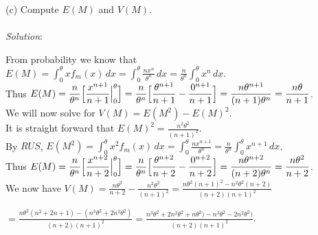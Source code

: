 \documentclass[12pt]{article}
\newcommand{\XB}{\color{black}}
\newcommand{\XV}{\color{violet}}
\begin{document}

(c) Compute $ E(M) $ and $ V(M) $. \\
\vspace{2.5mm} \\
\textit{Solution}:
\vspace{2.5mm}

\noindent 
From probability we know that $ \displaystyle E(M) = \int_{0}^{\theta} xf_{m}(x) \, dx = \int_{0}^{\theta} \frac{nx^{n}}{\theta^{n}} \, dx = \frac{n}{\theta^{n}} \int_{0}^{\theta} x^{n} \, dx $. \\

\noindent 
Thus $ \displaystyle E(M) = \frac{n}{\theta^{n}} \Bigl[ \frac{x^{n + 1}}{n + 1} \Big|_{0}^{\theta} \Bigr] = \frac{n}{\theta^{n}} \Bigl[ \frac{\theta^{n + 1}}{n + 1} - \frac{0^{n + 1}}{n + 1} \Bigr] = \frac{n\theta^{n + 1}}{(n + 1)\theta^{n}} = \frac{n\theta}{n + 1} $. \\

\noindent 
We will now solve for $ V(M) = E(M^{2}) - E(M)^{2} $. \\

\noindent 
It is straight forward that $ \displaystyle E(M)^{2} = \frac{n^{2}\theta^{2}}{(n + 1)^{2}} $. \\

\noindent 
By $ RUS $, $ \displaystyle E(M^{2}) = \int_{0}^{\theta} x^{2}f_{m}(x) \, dx = \int_{0}^{\theta} \frac{nx^{n+1}}{\theta^{n}} = \frac{n}{\theta^{n}} \int_{0}^{\theta} x^{n + 1} \, dx $. \\

\noindent
Thus $ \displaystyle E(M) = \frac{n}{\theta^{n}} \Bigl[ \frac{x^{n + 2}}{n + 2} \Big|_{0}^{\theta} \Bigr] = \frac{n}{\theta^{n}} \Bigl[ \frac{\theta^{n + 2}}{n + 2} - \frac{0^{n + 2}}{n + 2} \Bigr] = \frac{n\theta^{n + 2}}{(n + 2)\theta^{n}} = \frac{n\theta^{2}}{n + 2} $. \\

\noindent 
We now have $ \displaystyle V(M) = \frac{n\theta^{2}}{n + 2} - \frac{n^{2}\theta^{2}}{(n + 1)^{2}} = \frac{n\theta^{2}(n + 1)^{2} - n^{2}\theta^{2}(n + 2)}{(n + 2)(n + 1)^{2}} $ 

$ \displaystyle = \frac{n\theta^{2}(n^{2} + 2n + 1) - (n^{3}\theta^{2} + 2n^{2}\theta^{2})}{(n + 2)(n + 1)^{2}} = \frac{n^{3}\theta^{2} + 2n^{2}\theta^{2} + n\theta^{2}) - n^{3}\theta^{2} - 2n^{2}\theta^{2})}{(n + 2)(n + 1)^{2}} $. 
\end{document}
